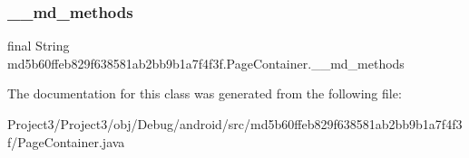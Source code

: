 \subsubsection{\texorpdfstring{\+\_\+\+\_\+md\+\_\+methods}{\_\_md\_methods}}
{\footnotesize\ttfamily final String md5b60ffeb829f638581ab2bb9b1a7f4f3f.\+Page\+Container.\+\_\+\+\_\+md\+\_\+methods\hspace{0.3cm}{\ttfamily [static]}}



The documentation for this class was generated from the following file\+:\begin{DoxyCompactItemize}
\item 
Project3/\+Project3/obj/\+Debug/android/src/md5b60ffeb829f638581ab2bb9b1a7f4f3f/Page\+Container.\+java\end{DoxyCompactItemize}
